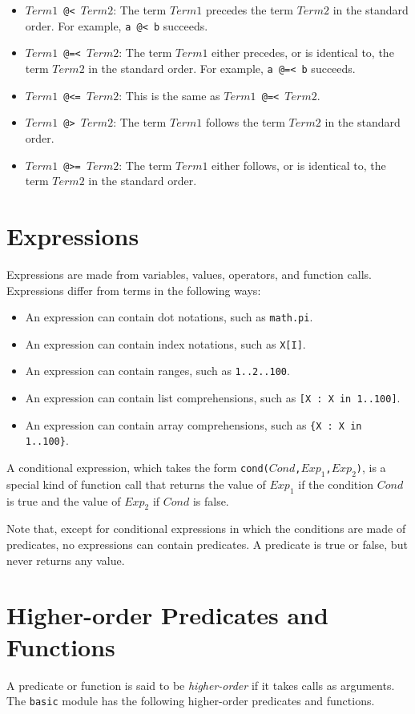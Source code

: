\begin{itemize}
\item \texttt{$Term1$ @< $Term2$}: The term $Term1$ precedes the term $Term2$ in the standard order. For example, \texttt{a @< b} succeeds.
\item \texttt{$Term1$ @=< $Term2$}: The term $Term1$ either precedes, or is identical to, the term $Term2$ in the standard order. For example, \texttt{a @=< b} succeeds.
\item \texttt{$Term1$ @<= $Term2$}: This is the same as \texttt{$Term1$ @=< $Term2$}.
\item \texttt{$Term1$ @> $Term2$}: The term $Term1$ follows the term $Term2$ in the standard order.
\item \texttt{$Term1$ @>= $Term2$}: The term $Term1$ either follows, or is identical to, the term $Term2$ in the standard order.
\end{itemize}

\section{Expressions}
Expressions are made from variables, values, operators, and function calls. Expressions differ from terms in the following ways: 
\begin{itemize}
\item An expression can contain dot notations, such as \texttt{math.pi}.
\item An expression can contain index notations, such as \texttt{X[I]}.
\item An expression can contain ranges, such as \texttt{1..2..100}.
\item An expression can contain list comprehensions, such as \texttt{[X : X in 1..100]}.
\item An expression can contain array comprehensions, such as \texttt{\{X : X in 1..100\}}.
\end{itemize}

A conditional expression, which takes the form \texttt{cond($Cond$,$Exp_1$,$Exp_2$)}, is a special kind of function call that returns the value of $Exp_1$ if the condition $Cond$ is true and the value of $Exp_2$ if $Cond$ is false.

Note that, except for conditional expressions in which the conditions are made of predicates, no expressions can contain predicates. A predicate is true or false, but never returns any value.


\section{Higher-order Predicates and Functions}
A predicate or function is said to be \emph{higher-order} if it takes calls as arguments. The \texttt{basic} module has the following higher-order predicates and functions.

